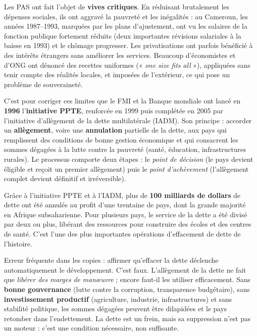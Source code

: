 \documentclass[11pt]{article}
\begin{document}
Les PAS ont fait l'objet de \textbf{vives critiques}. En réduisant brutalement les dépenses sociales, ils ont aggravé la pauvreté et les inégalités : au Cameroun, les années 1987--1993, marquées par les plans d'ajustement, ont vu les salaires de la fonction publique fortement réduits (deux importantes révisions salariales à la baisse en 1993) et le chômage progresser. Les privatisations ont parfois bénéficié à des intérêts étrangers sans améliorer les services. Beaucoup d'économistes et d'ONG ont dénoncé des recettes uniformes (« \emph{one size fits all} »), appliquées sans tenir compte des réalités locales, et imposées de l'extérieur, ce qui pose un problème de souveraineté.

C'est pour corriger ces limites que le FMI et la Banque mondiale ont lancé en \textbf{1996} l'\textbf{initiative PPTE}, renforcée en 1999 puis complétée en 2005 par l'initiative d'allègement de la dette multilatérale (IADM). Son principe : accorder un \textbf{allègement}, voire une \textbf{annulation} partielle de la dette, aux pays qui remplissent des conditions de bonne gestion économique et qui consacrent les sommes dégagées à la lutte contre la pauvreté (santé, éducation, infrastructures rurales). Le processus comporte deux étapes : le \emph{point de décision} (le pays devient éligible et reçoit un premier allègement) puis le \emph{point d'achèvement} (l'allègement complet devient définitif et irréversible).

\begin{exemplebox}
Grâce à l'initiative PPTE et à l'IADM, plus de \textbf{100 milliards de dollars} de dette ont été annulés au profit d'une trentaine de pays, dont la grande majorité en Afrique subsaharienne. Pour plusieurs pays, le service de la dette a été divisé par deux ou plus, libérant des ressources pour construire des écoles et des centres de santé. C'est l'une des plus importantes opérations d'effacement de dette de l'histoire.
\end{exemplebox}

\begin{attention}
Erreur fréquente dans les copies : affirmer qu'effacer la dette déclenche automatiquement le développement. C'est faux. L'allègement de la dette ne fait que \emph{libérer des marges de manœuvre} ; encore faut-il les utiliser efficacement. Sans \textbf{bonne gouvernance} (lutte contre la corruption, transparence budgétaire), sans \textbf{investissement productif} (agriculture, industrie, infrastructures) et sans stabilité politique, les sommes dégagées peuvent être dilapidées et le pays retomber dans l'endettement. La dette est un frein, mais sa suppression n'est pas un moteur : c'est une condition nécessaire, non suffisante.
\end{attention}
\end{document}
